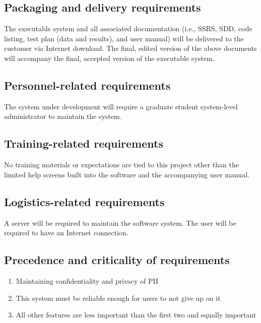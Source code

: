 		\subsection{Packaging and delivery requirements}
			The executable system and all associated documentation (i.e.,
			SSRS, SDD, code listing, test plan (data and results), and
			user manual) will be delivered to the customer via Internet
			download. The final, edited version of the above documents
			will accompany the final, accepted version of the executable system.
		\subsection{Personnel-related requirements}
			The system under development will require a graduate student
			system-level administrator to maintain the system.
		\subsection{Training-related requirements}
			No training materials or expectations are tied to this
			project other than the limited help screens built into the
			software and the accompanying user manual.
		\subsection{Logistics-related requirements}
			A server will be required to maintain the software system.
			The user will be required to have an Internet connection.
		\subsection{Precedence and criticality of requirements}
			\begin{enumerate}
				\item Maintaining confidentiality and privacy of PII
				\item This system must be reliable enough for users to not
					give up on it
				\item All other features are less important than the first
					two and equally important
			\end{enumerate}


